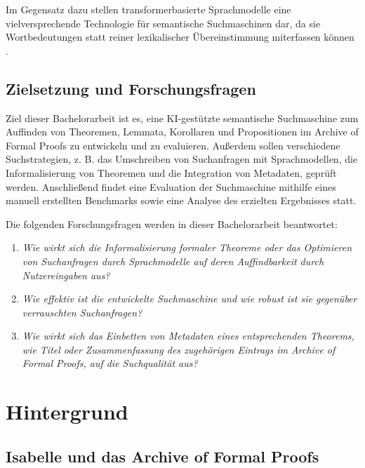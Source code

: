 \documentclass[12pt,letterpaper]{article} %
\begin{document}
Im Gegensatz dazu stellen transformerbasierte Sprachmodelle eine vielversprechende Technologie für semantische Suchmaschinen dar, da sie Wortbedeutungen statt reiner lexikalischer Übereinstimmung miterfassen können \citep{jain_llm_2024}.

\subsection{Zielsetzung und Forschungsfragen}
Ziel dieser Bachelorarbeit ist es, eine KI-gestützte semantische Suchmaschine zum Auffinden von Theoremen, Lemmata, Korollaren und Propositionen im Archive of Formal Proofs zu entwickeln und zu evaluieren.
Außerdem sollen verschiedene Suchstrategien, z. B. das Umschreiben von Suchanfragen mit Sprachmodellen, die Informalisierung von Theoremen und die Integration von Metadaten, geprüft werden.
Anschließend findet eine Evaluation der Suchmaschine mithilfe eines manuell erstellten Benchmarks sowie eine Analyse des erzielten Ergebnisses statt.

Die folgenden Forschungsfragen werden in dieser Bachelorarbeit beantwortet:
\begin{enumerate}
  \item \textit{Wie wirkt sich die Informalisierung formaler Theoreme oder das Optimieren von Suchanfragen durch Sprachmodelle auf deren Auffindbarkeit durch Nutzereingaben aus?}

  \item \textit{Wie effektiv ist die entwickelte Suchmaschine und wie robust ist sie gegenüber verrauschten Suchanfragen?}

  \item \textit{Wie wirkt sich das Einbetten von Metadaten eines entsprechenden Theorems, wie Titel oder Zusammenfassung des zugehörigen Eintrags im Archive of Formal Proofs, auf die Suchqualität aus?}
\end{enumerate}

\section{Hintergrund}

\subsection{Isabelle und das Archive of Formal Proofs}
\end{document}
